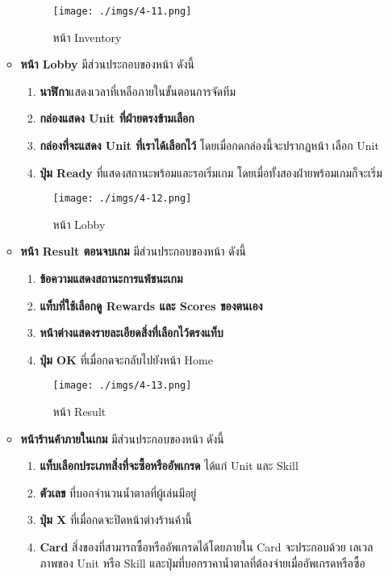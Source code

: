 \documentclass[12pt,oneside,openright,a4paper]{cpe-thai-project}
\begin{document}
\begin{enumerate}
\begin{itemize}
      \begin{figure}[H]\centering
        \texttt{[image: ./imgs/4-11.png]}
        \caption{หน้า Inventory}\label{fig:4-11}
      \end{figure}

      \pagebreak
      \item \textbf{หน้า Lobby} มีส่วนประกอบของหน้า ดังนี้ 
      \begin{enumerate}
        \item \textbf{นาฬิกา}แสดงเวลาที่เหลือภายในขั้นตอนการจัดทีม
        \item \textbf{กล่องแสดง Unit ที่ฝ่ายตรงข้ามเลือก} 
        \item \textbf{กล่องที่จะแสดง Unit ที่เราได้เลือกไว้} โดยเมื่อกดกล่องนี้จะปรากฏหน้า เลือก Unit 
        \item \textbf{ปุ่ม Ready} ที่แสดงสถานะพร้อมและรอเริ่มเกม โดยเมื่อทั้งสองฝ่ายพร้อมเกมก็จะเริ่ม
      \end{enumerate}
      
      \begin{figure}[H]\centering
        \texttt{[image: ./imgs/4-12.png]}
        \caption{หน้า Lobby}\label{fig:4-12}
      \end{figure}
     
      \item \textbf{หน้า Result ตอนจบเกม} มีส่วนประกอบของหน้า ดังนี้ 
      \begin{enumerate}
        \item \textbf{ข้อความแสดงสถานะการแพ้ชนะเกม}
        \item \textbf{แท็บที่ใช้เลือกดู Rewards และ Scores ของตนเอง} 
        \item \textbf{หน้าต่างแสดงรายละเอียดสิ่งที่เลือกไว้ตรงแท็บ} 
        \item \textbf{ปุ่ม OK} ที่เมื่อกดจะกลับไปยังหน้า Home 
      \end{enumerate}

      \begin{figure}[H]\centering
        \texttt{[image: ./imgs/4-13.png]}
        \caption{หน้า Result}\label{fig:4-13}
      \end{figure}

      \pagebreak
      \item \textbf{หน้าร้านค้าภายในเกม} มีส่วนประกอบของหน้า ดังนี้ 
      \begin{enumerate}
        \item \textbf{แท็บเลือกประเภทสิ่งที่จะซื้อหรืออัพเกรด} ได้แก่ Unit และ Skill 
        \item \textbf{ตัวเลข} ที่บอกจำนวนน้ำตาลที่ผู้เล่นมีอยู่ 
        \item \textbf{ปุ่ม X} ที่เมื่อกดจะปิดหน้าต่างร้านค้านี้ 
        \item \textbf{Card} สิ่งของที่สามารถซื้อหรืออัพเกรดได้โดยภายใน Card จะประกอบด้วย เลเวล 
        ภาพของ Unit หรือ Skill และปุ่มที่บอกราคาน้ำตาลที่ต้องจ่ายเมื่ออัพเกรดหรือซื้อ 
      \end{enumerate}


\end{itemize}
\end{enumerate}
\end{document}
